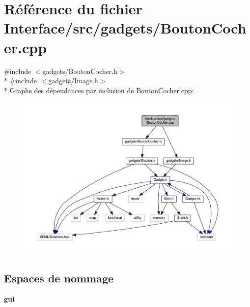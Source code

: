 \section{Référence du fichier Interface/src/gadgets/\+Bouton\+Cocher.cpp}
\label{_bouton_cocher_8cpp}
{\ttfamily \#include $<$gadgets/\+Bouton\+Cocher.\+h$>$}\\*
{\ttfamily \#include $<$gadgets/\+Image.\+h$>$}\\*
Graphe des dépendances par inclusion de Bouton\+Cocher.\+cpp\+:\nopagebreak
\begin{figure}[H]
\begin{center}
\leavevmode
\includegraphics[width=350pt]{_bouton_cocher_8cpp__incl}
\end{center}
\end{figure}
\subsection*{Espaces de nommage}
\begin{DoxyCompactItemize}
\item 
 {\bf gui}
\end{DoxyCompactItemize}
